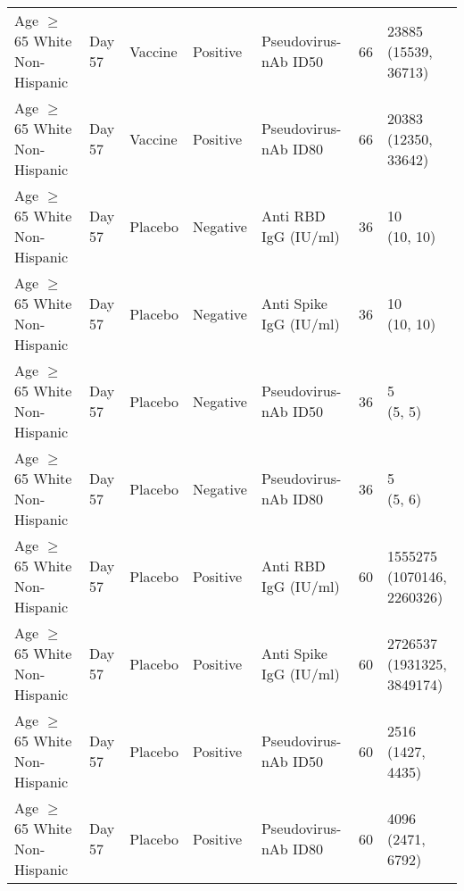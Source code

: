 \documentclass[]{book}
\theoremstyle{definition}
\theoremstyle{definition}
\theoremstyle{definition}
\newcommand{\1}{\mathbbm{1}}
\begin{document}
\begin{landscape}
\begin{ThreePartTable}
\begin{longtable}[t]{>{\raggedright\arraybackslash}p{7cm}llllll}
\hspace{1em}Age $\geq$ 65 White Non-Hispanic & Day 57 & Vaccine & Positive & Pseudovirus-nAb ID50 & 66 & \makecell[l]{23885\\(15539, 36713)}\\
\hspace{1em}Age $\geq$ 65 White Non-Hispanic & Day 57 & Vaccine & Positive & Pseudovirus-nAb ID80 & 66 & \makecell[l]{20383\\(12350, 33642)}\\
\hspace{1em}Age $\geq$ 65 White Non-Hispanic & Day 57 & Placebo & Negative & Anti RBD IgG (IU/ml) & 36 & \makecell[l]{10\\(10, 10)}\\
\hspace{1em}Age $\geq$ 65 White Non-Hispanic & Day 57 & Placebo & Negative & Anti Spike IgG (IU/ml) & 36 & \makecell[l]{10\\(10, 10)}\\
\hspace{1em}Age $\geq$ 65 White Non-Hispanic & Day 57 & Placebo & Negative & Pseudovirus-nAb ID50 & 36 & \makecell[l]{5\\(5, 5)}\\
\hspace{1em}Age $\geq$ 65 White Non-Hispanic & Day 57 & Placebo & Negative & Pseudovirus-nAb ID80 & 36 & \makecell[l]{5\\(5, 6)}\\
\hspace{1em}Age $\geq$ 65 White Non-Hispanic & Day 57 & Placebo & Positive & Anti RBD IgG (IU/ml) & 60 & \makecell[l]{1555275\\(1070146, 2260326)}\\
\hspace{1em}Age $\geq$ 65 White Non-Hispanic & Day 57 & Placebo & Positive & Anti Spike IgG (IU/ml) & 60 & \makecell[l]{2726537\\(1931325, 3849174)}\\
\hspace{1em}Age $\geq$ 65 White Non-Hispanic & Day 57 & Placebo & Positive & Pseudovirus-nAb ID50 & 60 & \makecell[l]{2516\\(1427, 4435)}\\
\hspace{1em}Age $\geq$ 65 White Non-Hispanic & Day 57 & Placebo & Positive & Pseudovirus-nAb ID80 & 60 & \makecell[l]{4096\\(2471, 6792)}\\*
\end{longtable}
\end{ThreePartTable}



\end{landscape}
\end{document}
